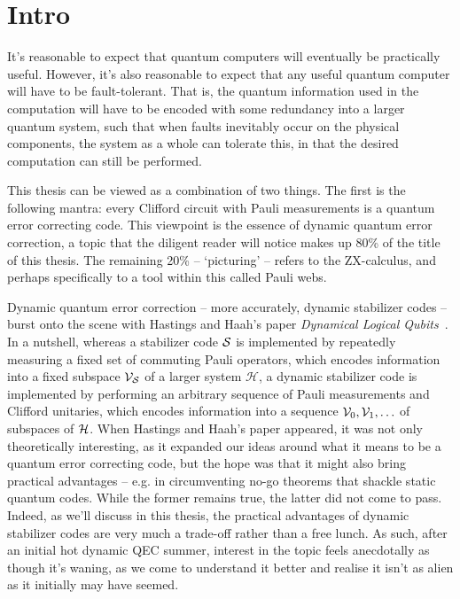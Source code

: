 \chapter{Intro}\label{ch:intro}
It's reasonable to expect that quantum computers will eventually be practically useful.
However, it's also reasonable to expect that any useful quantum computer will have to be fault-tolerant.
That is, the quantum information used in the computation will have to be encoded with some redundancy into a larger quantum system, such that when faults inevitably occur on the physical components, the system as a whole can tolerate this, in that the desired computation can still be performed.

This thesis can be viewed as a combination of two things.
The first is the following mantra: every Clifford circuit with Pauli measurements is a quantum error correcting code.
This viewpoint is the essence of dynamic quantum error correction, a topic that the diligent reader will notice makes up 80\% of the title of this thesis.
The remaining 20\% -- `picturing' -- refers to the ZX-calculus, and perhaps specifically to a tool within this called Pauli webs.


Dynamic quantum error correction -- more accurately, dynamic stabilizer codes -- burst onto the scene with Hastings and Haah's paper \textit{Dynamical Logical Qubits}~\cite{Hastings_2021}.
In a nutshell, whereas a stabilizer code $\mathcal{S}$ is implemented by repeatedly measuring a fixed set of commuting Pauli operators, which encodes information into a fixed subspace $\mathcal{V}_{\mathcal{S}}$ of a larger system $\mathcal{H}$, a dynamic stabilizer code is implemented by performing an arbitrary sequence of Pauli measurements and Clifford unitaries, which encodes information into a sequence $\mathcal{V}_0, \mathcal{V}_1, \ldots$ of subspaces of $\mathcal{H}$.
When Hastings and Haah's paper appeared, it was not only theoretically interesting, as it expanded our ideas around what it means to be a quantum error correcting code, but the hope was that it might also bring practical advantages -- e.g. in circumventing no-go theorems that shackle static quantum codes.
While the former remains true, the latter did not come to pass.
Indeed, as we'll discuss in this thesis, the practical advantages of dynamic stabilizer codes are very much a trade-off rather than a free lunch.
As such, after an initial hot dynamic QEC summer, interest in the topic feels anecdotally as though it's waning, as we come to understand it better and realise it isn't as alien as it initially may have seemed.

